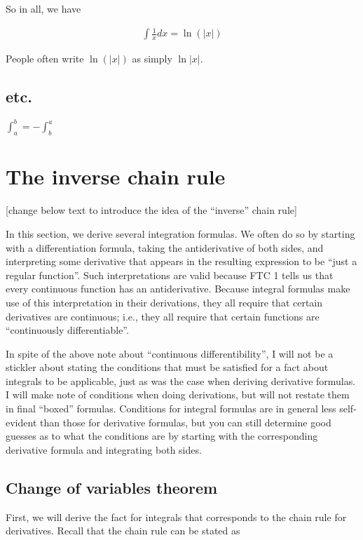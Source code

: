 So in all, we have 

\begin{align*}
    \boxed
    {
        \int \frac{1}{x} dx = \ln(|x|)
    }
\end{align*}

People often write $\ln(|x|)$ as simply $\ln|x|$.

\subsection*{etc.}

$\int_a^b = -\int_b^a$

\section*{The inverse chain rule}
    
[change below text to introduce the idea of the ``inverse'' chain rule]
    
In this section, we derive several integration formulas. We often do so by starting with a differentiation formula, taking the antiderivative of both sides, and interpreting some derivative that appears in the resulting expression to be ``just a regular function''. Such interpretations are valid because FTC 1 tells us that every continuous function has an antiderivative. Because integral formulas make use of this interpretation in their derivations, they all require that certain derivatives are continuous; i.e., they all require that certain functions are ``continuously differentiable''. 

In spite of the above note about ``continuous differentibility'', I will not be a stickler about stating the conditions that must be satisfied for a fact about integrals to be applicable, just as was the case when deriving derivative formulas. I will make note of conditions when doing derivations, but will not restate them in final ``boxed'' formulas. Conditions for integral formulas are in general less self-evident than those for derivative formulas, but you can still determine good guesses as to what the conditions are by starting with the corresponding derivative formula and integrating both sides.

\subsection*{Change of variables theorem}

First, we will derive the fact for integrals that corresponds to the chain rule for derivatives. Recall that the chain rule can be stated as

